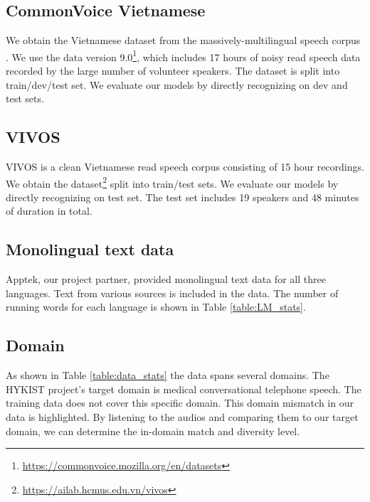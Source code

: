 \subsection{CommonVoice Vietnamese}

We obtain the Vietnamese dataset from the massively-multilingual speech corpus  \cite{ardila2020commonvoice}. 
We use the data version 9.0\footnote{\href{https://commonvoice.mozilla.org/en/datasets}{https://commonvoice.mozilla.org/en/datasets}}, which includes 17 hours of noisy read speech data recorded by the large number of volunteer speakers.
The dataset is split into train/dev/test set. 
We evaluate our models by directly recognizing on dev and test sets.

\subsection{VIVOS}

VIVOS \cite{vivos_dataset} is a clean Vietnamese read speech corpus consisting of 15 hour recordings.
We obtain the dataset\footnote{\href{https://ailab.hcmus.edu.vn/vivos}{https://ailab.hcmus.edu.vn/vivos}} split into train/test sets.
We evaluate our models by directly recognizing on test set.
The test set includes 19 speakers and 48 minutes of duration in total.


\subsection{Monolingual text data}

Apptek, our project partner, provided monolingual text data for all three languages.
Text from various sources is included in the data.
The number of running words for each language is shown in Table \ref{table:LM_stats}.

\subsection{Domain}

As shown in Table \ref{table:data_stats} the data spans several domains.
The HYKIST project's target domain is medical conversational telephone speech.
The training data does not cover this specific domain.
This domain mismatch in our data is highlighted.
By listening to the audios and comparing them to our target domain, we can determine the in-domain match and diversity level.


